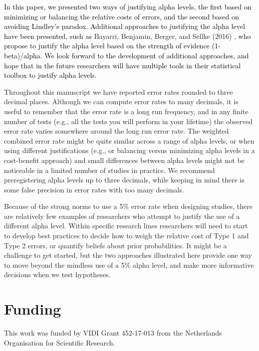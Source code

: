 \documentclass[
  english,
  ,man, a4paper,floatsintext]{apa6}
\begin{document}
\textcolor{black}{In this paper, we presented two ways of justifying alpha levels, the first based on minimizing or balancing the relative costs of errors, and the second based on avoiding Lindley's paradox. Additional approaches to justifying the alpha level have been presented, such as}
Bayarri, Benjamin, Berger, and Sellke (2016)
\textcolor{black}{, who propose to justify the alpha level based on the strength of evidence (1-beta)/alpha. We look forward to the development of additional approaches, and hope that in the future researchers will have multiple tools in their statistical toolbox to justify alpha levels.}

Throughout this manuscript we have reported error rates rounded to three decimal places. Although we can compute error rates to many decimals, it is useful to remember that the error rate is a long run frequency, and in any finite number of tests (e.g., all the tests you will perform in your lifetime) the observed error rate varies somewhere around the long run error rate. The weighted combined error rate might be quite similar across a range of alpha levels, or when using different justifications (e.g., or balancing versus minimizing alpha levels in a cost-benefit approach) and small differences between alpha levels might not be noticeable in a limited number of studies in practice. We recommend preregistering alpha levels up to three decimals, while keeping in mind there is some false precision in error rates with too many decimals.

Because of the strong norms to use a 5\% error rate when designing studies, there are relatively few examples of researchers who attempt to justify the use of a different alpha level. Within specific research lines researchers will need to start to develop best practices to decide how to weigh the relative cost of Type 1 and Type 2 errors, or quantify beliefs about prior probabilities. It might be a challenge to get started, but the two approaches illustrated here provide one way to move beyond the mindless use of a 5\% alpha level, and make more informative decisions when we test hypotheses.

\hypertarget{funding}{%
\section{Funding}\label{funding}}

This work was funded by VIDI Grant 452-17-013 from the Netherlands Organisation for Scientific Research.
\end{document}
